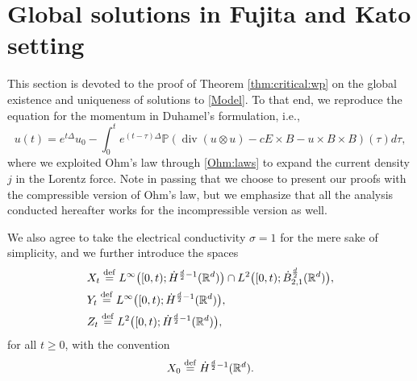 \documentclass[11pt, leqno, a4paper,]{amsart}
\theoremstyle{remark}
\numberwithin{equation}{section}
\newcommand*{\bydef}{\overset{\rm def}{=}}
\renewcommand*{\div}{\operatorname{div}}
\begin{document}
 



 \section{Global solutions in  Fujita and Kato setting}\label{sec:Fujita:Kato}
	This section is devoted to the proof of Theorem  \ref{thm:critical:wp} on the global existence and uniqueness of solutions to \eqref{Model}. To that end, we reproduce the equation for the    momentum  in Duhamel's formulation, i.e.,
\begin{equation}\label{u:Duhamel}
	u(t) = e^{t\Delta}u_0 - \int _0^t e^{(t-\tau)\Delta} \mathbb {P} \left ( \div (u\otimes u) - c E\times B - u\times B \times B\right)(\tau) d\tau,
\end{equation}	 
where we exploited Ohm's law through \eqref{Ohm:laws} to expand the current density $j$ in the Lorentz force. Note in passing that we choose to present our proofs with the compressible version of Ohm's law, but we emphasize that all the analysis conducted hereafter works for the incompressible version as well.

 We also agree to take the electrical conductivity $\sigma=1$ for the mere sake of simplicity, and we further introduce the spaces 
\begin{equation*}
\begin{aligned}
	&X_t \bydef   L^\infty \big ([0,t);\dot H^{\frac{d}{2}-1}(\mathbb {R}^d) \big ) \cap   L^2 \big ([0,t);\dot B^{\frac{d}{2}}_{2,1}(\mathbb {R}^d) \big ) ,\\
	&Y_t \bydef   L^\infty \big ([0,t);\dot H^{\frac{d}{2}-1}(\mathbb {R}^d) \big ),\\
	&Z_t \bydef   L^2 \big ([0,t);\dot H^{\frac{d}{2}-1}(\mathbb {R}^d) \big ),
	\end{aligned}
\end{equation*}
for all $t\geq 0$, with the convention 
\begin{equation*}
	X_0 \bydef \dot H^{\frac{d}{2}-1}(\mathbb {R}^d) .
\end{equation*}
\end{document}

